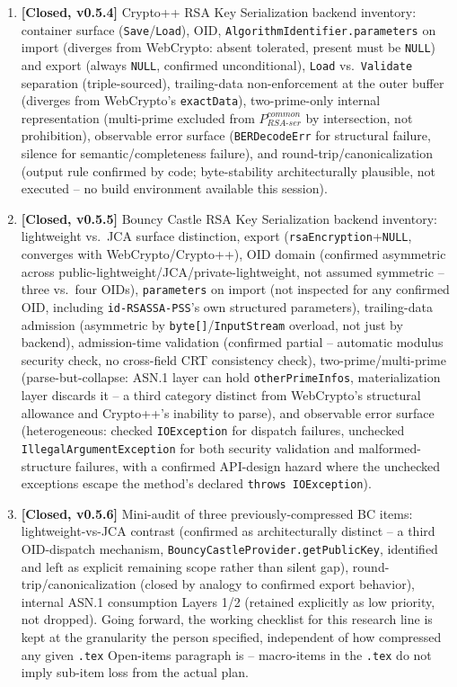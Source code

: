 \documentclass[11pt,a4paper]{article}
\begin{document}
\begin{enumerate}
\item \textbf{[Closed, v0.5.4]} Crypto++ RSA Key Serialization backend inventory: container surface (\texttt{Save}/\texttt{Load}), OID, \texttt{AlgorithmIdentifier.parameters} on import (diverges from WebCrypto: absent tolerated, present must be \texttt{NULL}) and export (always \texttt{NULL}, confirmed unconditional), \texttt{Load} vs.\ \texttt{Validate} separation (triple-sourced), trailing-data non-enforcement at the outer buffer (diverges from WebCrypto's \texttt{exactData}), two-prime-only internal representation (multi-prime excluded from $P_{RSA\text{-}ser}^{common}$ by intersection, not prohibition), observable error surface (\texttt{BERDecodeErr} for structural failure, silence for semantic/completeness failure), and round-trip/canonicalization (output rule confirmed by code; byte-stability architecturally plausible, not executed -- no build environment available this session).
\item \textbf{[Closed, v0.5.5]} Bouncy Castle RSA Key Serialization backend inventory: lightweight vs.\ JCA surface distinction, export (\texttt{rsaEncryption}+\texttt{NULL}, converges with WebCrypto/Crypto++), OID domain (confirmed asymmetric across public-lightweight/JCA/private-lightweight, not assumed symmetric -- three vs.\ four OIDs), \texttt{parameters} on import (not inspected for any confirmed OID, including \texttt{id-RSASSA-PSS}'s own structured parameters), trailing-data admission (asymmetric by \texttt{byte[]}/\texttt{InputStream} overload, not just by backend), admission-time validation (confirmed partial -- automatic modulus security check, no cross-field CRT consistency check), two-prime/multi-prime (parse-but-collapse: ASN.1 layer can hold \texttt{otherPrimeInfos}, materialization layer discards it -- a third category distinct from WebCrypto's structural allowance and Crypto++'s inability to parse), and observable error surface (heterogeneous: checked \texttt{IOException} for dispatch failures, unchecked \texttt{IllegalArgumentException} for both security validation and malformed-structure failures, with a confirmed API-design hazard where the unchecked exceptions escape the method's declared \texttt{throws IOException}).
\item \textbf{[Closed, v0.5.6]} Mini-audit of three previously-compressed BC items: lightweight-vs-JCA contrast (confirmed as architecturally distinct -- a third OID-dispatch mechanism, \texttt{BouncyCastleProvider.getPublicKey}, identified and left as explicit remaining scope rather than silent gap), round-trip/canonicalization (closed by analogy to confirmed export behavior), internal ASN.1 consumption Layers 1/2 (retained explicitly as low priority, not dropped). Going forward, the working checklist for this research line is kept at the granularity the person specified, independent of how compressed any given \texttt{.tex} Open-items paragraph is -- macro-items in the \texttt{.tex} do not imply sub-item loss from the actual plan.

\end{enumerate}
\end{document}
